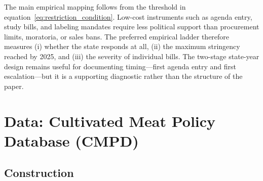 \documentclass[12pt]{article}
\begin{document}
The main empirical mapping follows from the threshold in equation~\eqref{eq:restriction_condition}.  Low-cost instruments such as agenda entry, study bills, and labeling mandates require less political support than procurement limits, moratoria, or sales bans.  The preferred empirical ladder therefore measures (i) whether the state responds at all, (ii) the maximum stringency reached by 2025, and (iii) the severity of individual bills.  The two-stage state-year design remains useful for documenting timing---first agenda entry and first escalation---but it is a supporting diagnostic rather than the structure of the paper.

\section{Data: Cultivated Meat Policy Database (CMPD)}
\label{sec:data}

\subsection{Construction}
\end{document}
